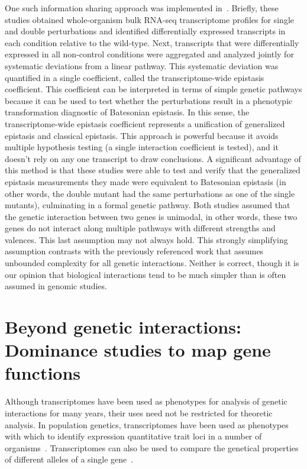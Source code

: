 One such information sharing approach was implemented
in~\citet{Angeles-Albores2018a,Angeles-Albores2017}. Briefly, these studies
obtained whole-organism bulk RNA-seq transcriptome profiles for single and
double perturbations and identified differentially expressed transcripts in each
condition relative to the wild-type. Next, transcripts that were differentially
expressed in all non-control conditions were aggregated and analyzed jointly for
systematic deviations from a linear pathway. This systematic deviation was
quantified in a single coefficient, called the transcriptome-wide epistasis
coefficient. This coefficient can be interpreted in terms of simple genetic
pathways because it can be used to test whether the perturbations result in a
phenotypic transformation diagnostic of Batesonian epistasis. In this sense, the
transcriptome-wide epistasis coefficient represents a unification of generalized
epistasis and classical epistasis. This approach is powerful because it avoids
multiple hypothesis testing (a single interaction coefficient is tested), and it
doesn't rely on any one transcript to draw conclusions. A significant advantage
of this method is that these studies were able to test and verify that the
generalized epistasis measurements they made were equivalent to Batesonian
epistasis (in other words, the double mutant had the same perturbations as one
of the single mutants), culminating in a formal genetic pathway. Both studies
assumed that the genetic interaction between two genes is unimodal, in other
words, these two genes do not interact along multiple pathways with different
strengths and valences. This last assumption may not always hold. This strongly
simplifying assumption contrasts with the previously referenced work that
assumes unbounded complexity for all genetic interactions. Neither is correct,
though it is our opinion that biological interactions tend to be much simpler
than is often assumed in genomic studies.

\section*{Beyond genetic interactions: Dominance studies to map gene
          functions}\label{sec:dominance_rev}
Although transcriptomes have been used as phenotypes for analysis of genetic
interactions for many years, their uses need not be restricted for theoretic
analysis. In population genetics, transcriptomes have been used as phenotypes
with which to identify expression quantitative trait loci in a number of
organisms~\citep{Brem2002,DeCook2006,Kirst2004,Schadt2003}. Transcriptomes can
also be used to compare the genetical properties of different alleles of a
single gene~\citep{Angeles-Albores2018b}.

